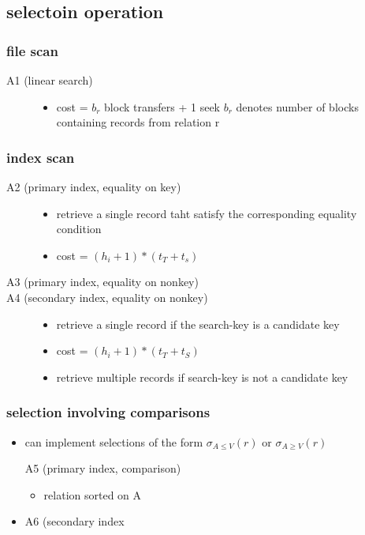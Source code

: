 \documentclass[11pt]{article}
\begin{document}
\subsection{selectoin operation}
\label{sec-18-2}
\subsubsection{file scan}
\label{sec-18-2-1}
\begin{description}
\item[{A1 (linear search)}] \begin{itemize}
\item cost = $b_r$ block transfers + 1 seek
$b_r$ denotes number of blocks containing records from relation r
\end{itemize}
\end{description}
\subsubsection{index scan}
\label{sec-18-2-2}
\begin{description}
\item[{A2 (primary index, equality on key)}] \begin{itemize}
\item retrieve a single record taht satisfy the corresponding equality condition
\item cost = $(h_i+1)*(t_T+t_s)$
\end{itemize}
\item[{A3 (primary index, equality on nonkey)}] 
\item[{A4 (secondary index, equality on nonkey)}] \begin{itemize}
\item retrieve a single record if the search-key is a candidate key
\item cost = $(h_i+1)*(t_T+t_S)$
\item retrieve multiple records if search-key is not a candidate key
\end{itemize}
\end{description}
\subsubsection{selection involving comparisons}
\label{sec-18-2-3}
\begin{itemize}
\item can implement selections of the form $\sigma_{A\le V}(r)$ or $\sigma_{A\ge V}(r)$
\item[{A5 (primary index, comparison)}] \begin{itemize}
\item relation sorted on A
\end{itemize}
\item A6 (secondary index
\end{itemize}
\end{document}
